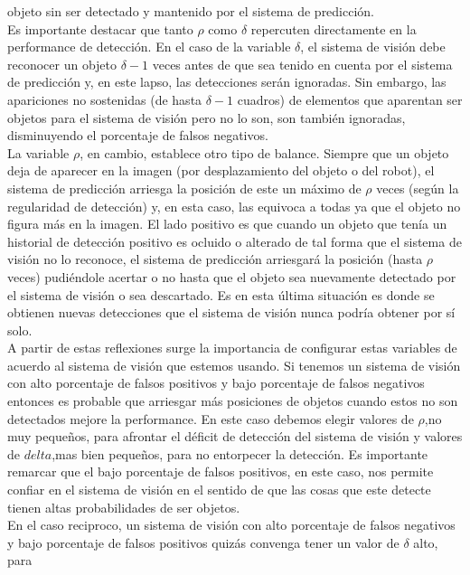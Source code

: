 objeto sin ser detectado y mantenido por el sistema de predicción. \\ 
\indent Es importante destacar que tanto $\rho$ como $\delta$ repercuten directamente en la 
performance de detección. En el caso de la variable $\delta$, el 
sistema de visión debe reconocer un objeto $\delta -1$ veces antes de que sea 
tenido en cuenta por el sistema de predicción y, en este lapso, las 
detecciones serán ignoradas. Sin embargo, las apariciones no sostenidas 
(de hasta $\delta -1$ cuadros) de elementos que aparentan ser objetos 
para el sistema de visión pero no lo son, son también ignoradas, 
disminuyendo el porcentaje de falsos negativos.\\
\indent La variable $\rho$, en cambio, establece otro tipo de balance. 
	Siempre que un objeto deja de aparecer en la imagen (por 
	desplazamiento del objeto o del robot), el sistema de 
	predicción arriesga la posición de este un máximo de $\rho$ veces 
	(según la regularidad de detección) y, en esta caso, las equivoca a 
	todas ya que el objeto no figura más en la imagen. El lado 
	positivo es que cuando un objeto que tenía un historial de 
	detección positivo es ocluido o alterado de tal forma que el 
	sistema de visión no lo reconoce, el sistema de predicción 
	arriesgará la posición (hasta $\rho$ veces) pudiéndole acertar o no hasta que el objeto 
	sea nuevamente detectado por el sistema de visión o sea descartado. 
	Es en esta última situación es donde se obtienen nuevas detecciones que el sistema de visión 
	nunca podría obtener por sí solo.\\
	\indent A partir de estas reflexiones surge la importancia de configurar 
	estas variables de acuerdo al sistema de visión que estemos 
	usando. Si tenemos un sistema de visión con alto porcentaje de 
	falsos positivos y bajo porcentaje de falsos negativos entonces es 
	probable que arriesgar más posiciones de objetos cuando estos no 
	son detectados mejore la performance. En este caso debemos elegir 
	valores de $\rho$,no muy pequeños, para afrontar el déficit de 
	detección del sistema de visión  y valores de $delta$,mas bien 
	pequeños, para no entorpecer la detección. Es importante remarcar 
	que el bajo porcentaje de falsos positivos, en este caso, nos 
	permite confiar en el sistema de visión en el sentido de que las cosas que 
	este detecte tienen altas probabilidades de ser objetos. \\
	\indent En el caso reciproco, un sistema de visión con alto 
	porcentaje de falsos negativos y bajo porcentaje de falsos 
	positivos quizás convenga tener un valor de $\delta$ alto, para 

